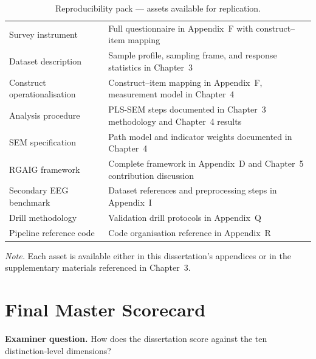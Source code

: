 {\tablestripes\tablefontsize
{}
\begin{xltabular}{\textwidth}{@{} >{\raggedright\arraybackslash}p{5.0cm} L @{}}
\caption[Reproducibility pack]{Reproducibility pack --- assets available for replication.}\label{tab:dist_reproducibility} \\
\toprule
{} &  \\
\midrule
\endfirsthead
\endhead
\bottomrule
\endlastfoot
Survey instrument & Full questionnaire in Appendix~F with construct--item mapping \\
\addlinespace
Dataset description & Sample profile, sampling frame, and response statistics in Chapter~3 \\
\addlinespace
Construct operationalisation & Construct--item mapping in Appendix~F, measurement model in Chapter~4 \\
\addlinespace
Analysis procedure & PLS-SEM steps documented in Chapter~3 methodology and Chapter~4 results \\
\addlinespace
SEM specification & Path model and indicator weights documented in Chapter~4 \\
\addlinespace
RGAIG framework & Complete framework in Appendix~D and Chapter~5 contribution discussion \\
\addlinespace
Secondary EEG benchmark & Dataset references and preprocessing steps in Appendix~I \\
\addlinespace
Drill methodology & Validation drill protocols in Appendix~Q \\
\addlinespace
Pipeline reference code & Code organisation reference in Appendix~R \\
\end{xltabular}}

\vspace{0.3em}\noindent\textit{Note.} Each asset is available either in this dissertation's appendices or in the supplementary materials referenced in Chapter~3.


\section{Final Master Scorecard}
\label{app:distinction_master_scorecard}

\noindent\textbf{Examiner question.} How does the dissertation score against the ten distinction-level dimensions?


